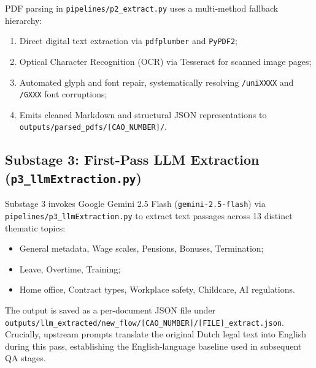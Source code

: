 PDF parsing in \nolinkurl{pipelines/p2_extract.py} uses a multi-method fallback hierarchy:
\begin{enumerate}[leftmargin=1.5em]
  \item Direct digital text extraction via \texttt{pdfplumber} and \texttt{PyPDF2};
  \item Optical Character Recognition (OCR) via Tesseract for scanned image pages;
  \item Automated glyph and font repair, systematically resolving \texttt{/uniXXXX} and \texttt{/GXXX} font corruptions;
  \item Emits cleaned Markdown and structural JSON representations to \nolinkurl{outputs/parsed_pdfs/[CAO_NUMBER]/}.
\end{enumerate}

\subsection{Substage 3: First-Pass LLM Extraction (\texttt{p3\_llmExtraction.py})}
\label{subsec:p3}

Substage 3 invokes Google Gemini 2.5 Flash (\texttt{gemini-2.5-flash}) via \nolinkurl{pipelines/p3_llmExtraction.py} to extract text passages across 13 distinct thematic topics:
\begin{itemize}[leftmargin=1.5em]
  \item General metadata, Wage scales, Pensions, Bonuses, Termination;
  \item Leave, Overtime, Training;
  \item Home office, Contract types, Workplace safety, Childcare, AI regulations.
\end{itemize}
The output is saved as a per-document JSON file under \nolinkurl{outputs/llm_extracted/new_flow/[CAO_NUMBER]/[FILE]_extract.json}. Crucially, upstream prompts translate the original Dutch legal text into English during this pass, establishing the English-language baseline used in subsequent QA stages.

